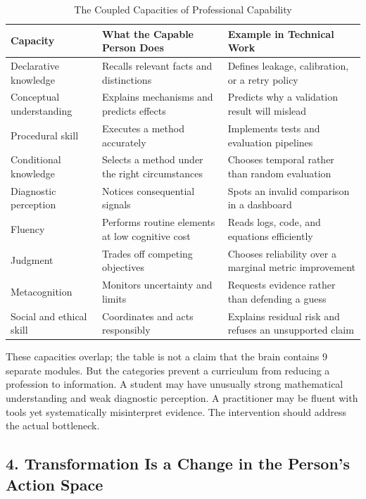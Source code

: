 \begin{table}[t]
\centering
\small
\caption{The Coupled Capacities of Professional Capability}
\begin{tabularx}{\textwidth}{p{}p{}X}
\toprule
\textbf{Capacity} & \textbf{What the Capable Person Does} & \textbf{Example in Technical Work} \\
\midrule
Declarative knowledge & Recalls relevant facts and distinctions & Defines leakage, calibration, or a retry policy \\
Conceptual understanding & Explains mechanisms and predicts effects & Predicts why a validation result will mislead \\
Procedural skill & Executes a method accurately & Implements tests and evaluation pipelines \\
Conditional knowledge & Selects a method under the right circumstances & Chooses temporal rather than random evaluation \\
Diagnostic perception & Notices consequential signals & Spots an invalid comparison in a dashboard \\
Fluency & Performs routine elements at low cognitive cost & Reads logs, code, and equations efficiently \\
Judgment & Trades off competing objectives & Chooses reliability over a marginal metric improvement \\
Metacognition & Monitors uncertainty and limits & Requests evidence rather than defending a guess \\
Social and ethical skill & Coordinates and acts responsibly & Explains residual risk and refuses an unsupported claim \\
\bottomrule
\end{tabularx}
\end{table}

These capacities overlap; the table is not a claim that the brain contains 9 separate modules. But the categories prevent a curriculum from reducing a profession to information. A student may have unusually strong mathematical understanding and weak diagnostic perception. A practitioner may be fluent with tools yet systematically misinterpret evidence. The intervention should address the actual bottleneck.

\subsection*{4. Transformation Is a Change in the Person's Action Space}

